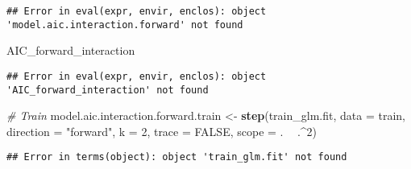 \documentclass[]{article}
\newenvironment{Shaded}{\begin{snugshade}}{\end{snugshade}}
\newcommand{\CommentTok}[1]{\textcolor[rgb]{0.56,0.35,0.01}{\textit{#1}}}
\newcommand{\DataTypeTok}[1]{\textcolor[rgb]{0.13,0.29,0.53}{#1}}
\newcommand{\DecValTok}[1]{\textcolor[rgb]{0.00,0.00,0.81}{#1}}
\newcommand{\KeywordTok}[1]{\textcolor[rgb]{0.13,0.29,0.53}{\textbf{#1}}}
\newcommand{\NormalTok}[1]{#1}
\newcommand{\OperatorTok}[1]{\textcolor[rgb]{0.81,0.36,0.00}{\textbf{#1}}}
\newcommand{\OtherTok}[1]{\textcolor[rgb]{0.56,0.35,0.01}{#1}}
\newcommand{\StringTok}[1]{\textcolor[rgb]{0.31,0.60,0.02}{#1}}
\begin{document}
\begin{Shaded}
\end{Shaded}

\begin{verbatim}
## Error in eval(expr, envir, enclos): object 'model.aic.interaction.forward' not found
\end{verbatim}

\begin{Shaded}
\begin{Highlighting}[]
\NormalTok{AIC_forward_interaction}
\end{Highlighting}
\end{Shaded}

\begin{verbatim}
## Error in eval(expr, envir, enclos): object 'AIC_forward_interaction' not found
\end{verbatim}

\begin{Shaded}
\begin{Highlighting}[]
\CommentTok{# Train}
\NormalTok{model.aic.interaction.forward.train <-}\StringTok{ }\KeywordTok{step}\NormalTok{(train_glm.fit,  }\DataTypeTok{data =}\NormalTok{ train, }\DataTypeTok{direction =} \StringTok{"forward"}\NormalTok{, }\DataTypeTok{k =} \DecValTok{2}\NormalTok{, }\DataTypeTok{trace =} \OtherTok{FALSE}\NormalTok{,}
                                      \DataTypeTok{scope =}\NormalTok{ . }\OperatorTok{~}\StringTok{ }\NormalTok{.}\OperatorTok{^}\DecValTok{2}\NormalTok{)}
\end{Highlighting}
\end{Shaded}

\begin{verbatim}
## Error in terms(object): object 'train_glm.fit' not found
\end{verbatim}

\begin{Shaded}
\end{Shaded}
\end{document}
